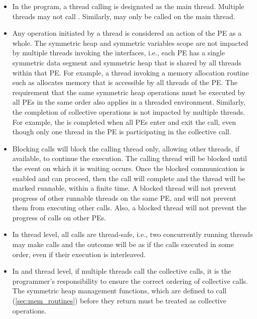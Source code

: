 \begin{itemize}
\item
In the \openshmem{} program, a thread calling  is designated as the main
thread. Multiple threads may not call . Similarly,
 may only be called on the main thread.

\item
Any \openshmem{} operation initiated by a thread is considered an action of the \ac{PE} as a whole.
The symmetric heap and symmetric variables scope
are not impacted by multiple threads invoking the
\openshmem{} interfaces, i.e., 
each \ac{PE} has a single symmetric data segment and symmetric heap that is shared by
all threads within that \ac{PE}.  For example, a thread invoking a memory allocation
routine such as  
allocates memory that is accessible by all threads of the \ac{PE}. 
The requirement that the same symmetric heap operations must
be executed by all \acp{PE} in the same order also applies in a threaded
environment. Similarly, the completion of collective operations is not impacted by multiple threads. 
For example, the  is completed when all \acp{PE} enter and
exit the  call, even though only one thread in the \ac{PE} is
participating in the collective call. 

\item Blocking \openshmem{} calls will block the calling thread only, allowing
other threads, if available, to continue the execution. The calling thread will be blocked until the
event on which it is waiting occurs. Once the blocked communication is enabled
and can proceed, then the call will complete and the thread will be marked
runnable, within a finite time. A blocked thread will not prevent progress of
other runnable threads on the same \ac{PE}, and will not prevent them from
executing other \openshmem{} calls. Also, a blocked thread will not prevent the
progress of \openshmem{} calls on other \acp{PE}. 

\item In  thread level, all \openshmem{} calls are thread-safe, 
i.e., two concurrently running threads may make \openshmem{} calls and the outcome will be as if the calls executed in
some order, even if their execution is interleaved.


\item
In  and  thread level, 
if multiple threads call the collective calls, it is the programmer's responsibility to ensure the correct ordering of
collective calls.  The symmetric heap management functions, which are defined to call
(\ref{sec:mem_routines}) before they return 
must be treated as collective operations.


\end{itemize} 
